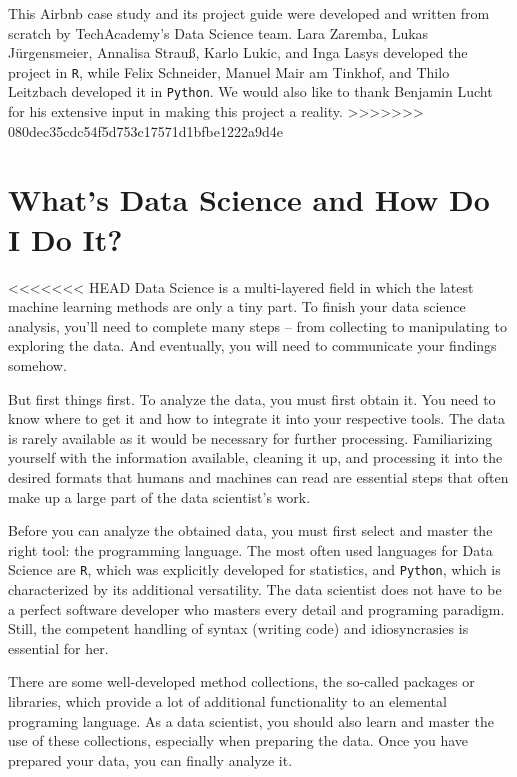 \documentclass[
  11pt,
]{article}
\begin{document}
This Airbnb case study and its project guide were developed and written from scratch by TechAcademy's Data Science team. Lara Zaremba, Lukas Jürgensmeier, Annalisa Strauß, Karlo Lukic, and Inga Lasys developed the project in \texttt{R}, while Felix Schneider, Manuel Mair am Tinkhof, and Thilo Leitzbach developed it in \texttt{Python}. We would also like to thank Benjamin Lucht for his extensive input in making this project a reality.
>>>>>>> 080dec35cdc54f5d753c17571d1bfbe1222a9d4e

\hypertarget{whats-data-science-and-how-do-i-do-it}{%
\section{What's Data Science and How Do I Do It?}\label{whats-data-science-and-how-do-i-do-it}}

<<<<<<< HEAD
Data Science is a multi-layered field in which the latest machine learning methods are only a tiny part.
To finish your data science analysis, you'll need to complete many steps -- from collecting to manipulating to exploring the data.
And eventually, you will need to communicate your findings somehow.

But first things first.
To analyze the data, you must first obtain it.
You need to know where to get it and how to integrate it into your respective tools.
The data is rarely available as it would be necessary for further processing.
Familiarizing yourself with the information available, cleaning it up, and processing it into the desired formats that humans and machines can read are essential steps that often make up a large part of the data scientist's work.

Before you can analyze the obtained data, you must first select and master the right tool: the programming language.
The most often used languages for Data Science are \texttt{R}, which was explicitly developed for statistics, and \texttt{Python}, which is characterized by its additional versatility.
The data scientist does not have to be a perfect software developer who masters every detail and programing paradigm.
Still, the competent handling of syntax (writing code) and idiosyncrasies is essential for her.

There are some well-developed method collections, the so-called packages or libraries, which provide a lot of additional functionality to an elemental programing language.
As a data scientist, you should also learn and master the use of these collections, especially when preparing the data.
Once you have prepared your data, you can finally analyze it.
\end{document}
